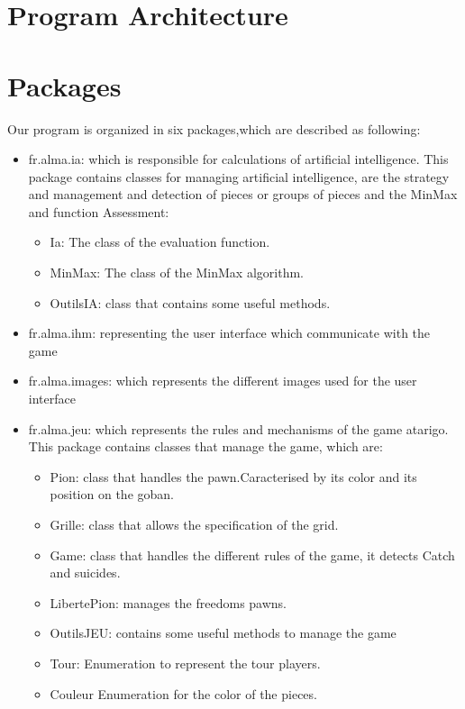 \documentclass{report}
\begin{document}
\section*{Program Architecture}


\section{Packages}


Our program is organized in six packages,which are described as following:\\
\begin{itemize}
\item { {\large fr.alma.ia}:  which is responsible for calculations of artificial intelligence.
This package contains classes for managing artificial intelligence, are the strategy and
management and detection of pieces or groups of pieces and the MinMax and function
Assessment:
\begin {itemize}
   \item Ia: The class of the evaluation function.
   \item MinMax: The class of the MinMax algorithm.
   \item OutilsIA: class that contains some useful methods.
\end{itemize} 
}
\item { {\large fr.alma.ihm}:  representing the user interface which communicate with the game}\\
\item { {\large fr.alma.images}:  which represents the different images used for the user interface}\\
\item { {\large fr.alma.jeu}:  which represents the rules and mechanisms of the game atarigo.
  This package contains classes that manage the game, which are:
\begin {itemize}
   \item Pion: class that handles the pawn.Caracterised by its color and its position on the goban.
   \item Grille: class that allows the specification of the grid.
   \item Game: class that handles the different rules of the game, it detects
       Catch and suicides.
   \item LibertePion: manages the freedoms pawns.
   \item OutilsJEU: contains some useful methods to manage the game
  \item Tour: Enumeration to represent the tour players.
   \item Couleur Enumeration for the color of the pieces.
\end{itemize} 
}


\end{itemize}
\end{document}
